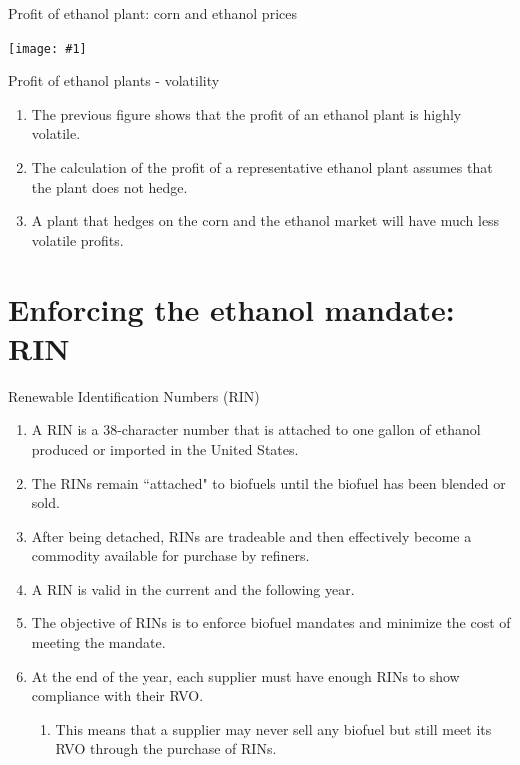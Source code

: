 \documentclass[table,xcolor=pdftex,dvipsnames]{beamer}\usepackage[]{graphicx}\usepackage[]{color}
\newcommand {\framedgraphic}[1] {
        \begin{center}
            \texttt{[image: \#1]}
        \end{center}
        \vspace{-1\baselineskip}
}
\begin{document}

\begin{frame}{Profit of ethanol plant: corn and ethanol prices}
    \framedgraphic{3_graphs.png}
\end{frame}



\begin{frame}{Profit of ethanol plants - volatility}
\begin{enumerate}[label=\textbullet]
    \item The previous figure shows that the profit of an ethanol plant is highly volatile.
    \item The calculation of the profit of a representative ethanol plant assumes that the plant does not hedge.
    \item A plant that hedges on the corn and the ethanol market will have much less volatile profits.
\end{enumerate}
\end{frame}


\section{Enforcing the ethanol mandate: RIN}

\begin{frame}{Renewable Identification Numbers (RIN)}
\begin{enumerate}[label=\textbullet]
    \item A RIN is a 38-character number that is attached to one gallon of ethanol produced or imported in the United States.
    \item The RINs remain ``attached" to biofuels until the biofuel has been blended or sold.
    \item After being detached, RINs are tradeable and then effectively become a commodity available for purchase by refiners.
    \item A RIN is valid in the current and the following year.
    \item The objective of RINs is to enforce biofuel mandates and minimize the cost of meeting the mandate.
    \item At the end of the year, each supplier must have enough RINs to show compliance with their RVO.
      \begin{enumerate}[label=-]
          \item This means that a supplier may never sell any biofuel but still meet its RVO through the purchase of RINs.
      \end{enumerate}
\end{enumerate}
\end{frame}
\end{document}
